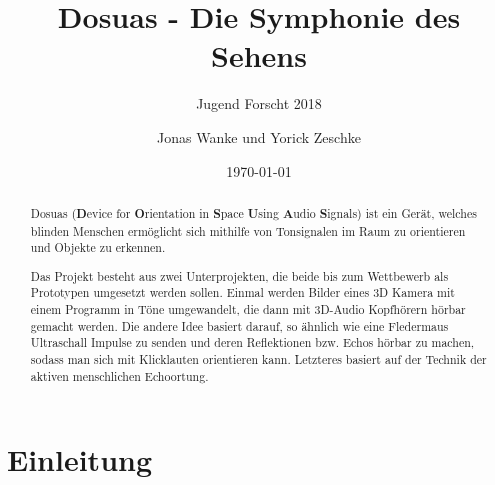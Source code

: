 \documentclass[a4paper,12pt,ngerman]{scrartcl}
\title{Dosuas - Die Symphonie des Sehens}
\subtitle{Jugend Forscht 2018}
\author{Jonas Wanke und Yorick Zeschke}
\date{\today}
\begin{document}
\maketitle


\begin{abstract}
	Dosuas (\textbf{D}evice for \textbf{O}rientation in \textbf{S}pace \textbf{U}sing 
	\textbf{A}udio \textbf{S}ignals) ist ein Gerät, welches blinden Menschen ermöglicht
	sich mithilfe von Tonsignalen im Raum zu orientieren und Objekte zu erkennen.\par
	Das Projekt besteht aus zwei Unterprojekten, die beide bis zum 
	Wettbewerb als Prototypen umgesetzt werden sollen. Einmal werden Bilder eines 3D Kamera
	mit einem Programm in Töne umgewandelt, die dann mit 3D-Audio Kopfhörern hörbar gemacht
	werden. Die andere Idee basiert darauf, so ähnlich wie eine Fledermaus Ultraschall 
	Impulse zu senden und deren Reflektionen bzw. Echos hörbar zu machen, sodass man
	sich mit Klicklauten orientieren kann. Letzteres basiert auf der Technik der aktiven
	menschlichen Echoortung.
\end{abstract}

\tableofcontents

\newpage

\section{Einleitung}
\end{document}
